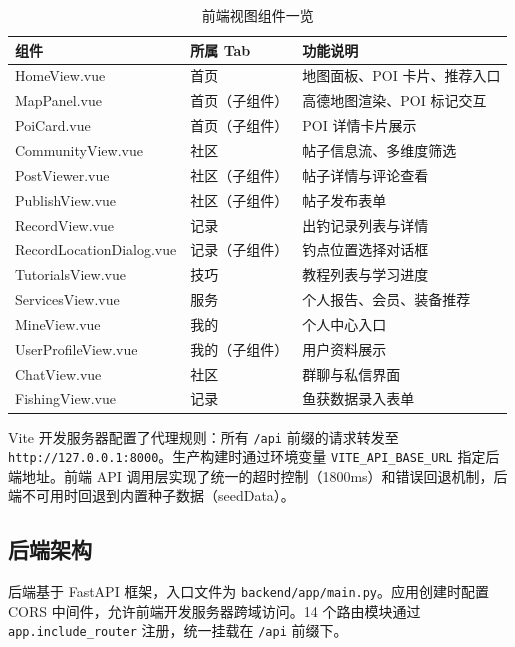 \documentclass[12pt,a4paper]{ctexart}
\begin{document}
\begin{table}[H]
  \centering
  \caption{前端视图组件一览}
  \label{tab:frontend-components}
  \begin{tabular}{p{3cm}p{3cm}p{6cm}}
    \toprule
    \textbf{组件} & \textbf{所属 Tab} & \textbf{功能说明} \\
    \midrule
    HomeView.vue & 首页 & 地图面板、POI 卡片、推荐入口 \\
    MapPanel.vue & 首页（子组件） & 高德地图渲染、POI 标记交互 \\
    PoiCard.vue & 首页（子组件） & POI 详情卡片展示 \\
    CommunityView.vue & 社区 & 帖子信息流、多维度筛选 \\
    PostViewer.vue & 社区（子组件） & 帖子详情与评论查看 \\
    PublishView.vue & 社区（子组件） & 帖子发布表单 \\
    RecordView.vue & 记录 & 出钓记录列表与详情 \\
    RecordLocationDialog.vue & 记录（子组件） & 钓点位置选择对话框 \\
    TutorialsView.vue & 技巧 & 教程列表与学习进度 \\
    ServicesView.vue & 服务 & 个人报告、会员、装备推荐 \\
    MineView.vue & 我的 & 个人中心入口 \\
    UserProfileView.vue & 我的（子组件） & 用户资料展示 \\
    ChatView.vue & 社区 & 群聊与私信界面 \\
    FishingView.vue & 记录 & 鱼获数据录入表单 \\
    \bottomrule
  \end{tabular}
\end{table}

Vite 开发服务器配置了代理规则：所有 \texttt{/api} 前缀的请求转发至 \texttt{http://127.0.0.1:8000}。生产构建时通过环境变量 \texttt{VITE\_API\_BASE\_URL} 指定后端地址。前端 API 调用层实现了统一的超时控制（1800ms）和错误回退机制，后端不可用时回退到内置种子数据（seedData）。

\subsection{后端架构}

后端基于 FastAPI 框架，入口文件为 \texttt{backend/app/main.py}。应用创建时配置 CORS 中间件，允许前端开发服务器跨域访问。14 个路由模块通过 \texttt{app.include\_router} 注册，统一挂载在 \texttt{/api} 前缀下。
\end{document}
